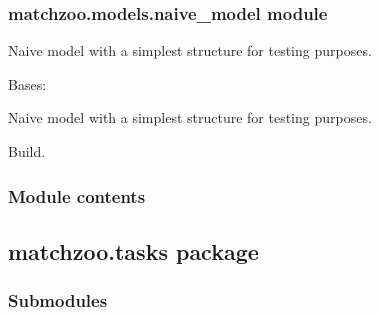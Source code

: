 \documentclass[letterpaper,10pt,english]{sphinxmanual}
\begin{document}
\subsubsection{matchzoo.models.naive\_model module}
\label{\detokenize{matchzoo.models:matchzoo-models-naive-model-module}}\label{\detokenize{matchzoo.models:module-matchzoo.models.naive_model}}
Naive model with a simplest structure for testing purposes.

\begin{fulllineitems}
\label{\detokenize{matchzoo.models:matchzoo.models.naive_model.NaiveModel}}
Bases: {\hyperref[\detokenize{matchzoo.engine:matchzoo.engine.base_model.BaseModel}]{}}

Naive model with a simplest structure for testing purposes.

\begin{fulllineitems}
\label{\detokenize{matchzoo.models:matchzoo.models.naive_model.NaiveModel.build}}
Build.

\end{fulllineitems}


\end{fulllineitems}



\subsubsection{Module contents}
\label{\detokenize{matchzoo.models:module-matchzoo.models}}\label{\detokenize{matchzoo.models:module-contents}}

\subsection{matchzoo.tasks package}
\label{\detokenize{matchzoo.tasks::doc}}\label{\detokenize{matchzoo.tasks:matchzoo-tasks-package}}

\subsubsection{Submodules}
\label{\detokenize{matchzoo.tasks:submodules}}
\end{document}
